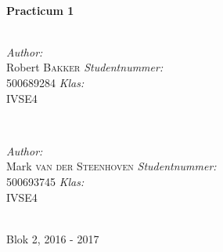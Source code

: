 \documentclass[12pt,notitlepage]{article}
\begin{document}
\begin{titlepage}
\HRule \\[0.4cm]
{ \huge \bfseries Practicum 1}\\[0.2cm] %
\HRule \\[1.2cm]



\begin{minipage}{0.4\textwidth}
\begin{flushleft} \large
\emph{Author:}\\
Robert \textsc{Bakker} %
\linebreak
\linebreak
\emph{Studentnummer:}\\
500689284
\linebreak
\linebreak
\emph{Klas:}\\
IVSE4

\end{flushleft}
\end{minipage}
~
\begin{minipage}{0.4\textwidth}
\begin{flushright} \large
\emph{Author:}\\
Mark \textsc{van der Steenhoven} %
\linebreak
\linebreak
\emph{Studentnummer:}\\
500693745
\linebreak
\linebreak
\emph{Klas:}\\
IVSE4
\end{flushright}
\end{minipage}\\[4cm]


{\large Blok 2, 2016 - 2017}\\[3cm] %




\vfill %

\end{titlepage}
\end{document}
